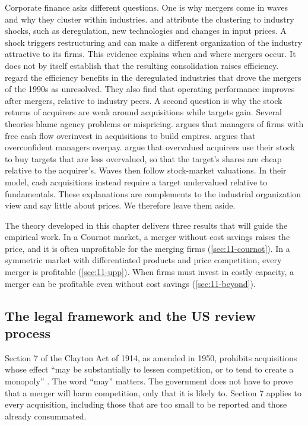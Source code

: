 Corporate finance asks different questions. One is why mergers come in waves and why they cluster within
industries. \citet{MitchellMulherin1996} and \citet{AndradeMitchellStafford2001} attribute the clustering to
industry shocks, such as deregulation, new technologies and changes in input prices. A shock triggers
restructuring and can make a different organization of the industry attractive to its firms. This evidence explains
when and where mergers occur. It does not by itself establish that the resulting consolidation raises efficiency.
\citet{AndradeMitchellStafford2001} regard the efficiency benefits in the deregulated industries that drove the
mergers of the 1990s as unresolved. They also find that operating performance improves after mergers, relative to
industry peers. A second question is why the stock returns of acquirers are weak around acquisitions while
targets gain. Several theories blame agency problems or mispricing. \citet{Jensen1986} argues that managers of
firms with free cash flow overinvest in acquisitions to build empires. \citet{Roll1986} argues that overconfident
managers overpay. \citet{ShleiferVishny2003} argue that overvalued acquirers use their stock to buy targets that
are less overvalued, so that the target's shares are cheap relative to the acquirer's. Waves then follow
stock-market valuations. In their model, cash acquisitions instead require a target undervalued relative to
fundamentals. These explanations are complements to the industrial
organization view and say little about prices. We therefore leave them aside.

The theory developed in this chapter delivers three results that will guide the empirical work. In a Cournot
market, a merger without cost savings raises the price, and it is often unprofitable for the merging firms
(\cref{sec:11-cournot}). In a symmetric market with differentiated products and price competition, every merger
is profitable (\cref{sec:11-upp}). When firms must invest in costly capacity, a merger can be profitable even
without cost savings (\cref{sec:11-beyond}).

\subsection{The legal framework and the US review process}\label{sec:11-review}

Section 7 of the Clayton Act of 1914, as amended in 1950, prohibits acquisitions whose effect ``may be
substantially to lessen competition, or to tend to create a monopoly'' \citep[p.~2]{FarrellShapiro2010}. The
word ``may'' matters. The government does not have to prove that a merger will harm competition, only that it is
likely to. Section 7 applies to every acquisition, including those that are too small to be reported and those
already consummated.

